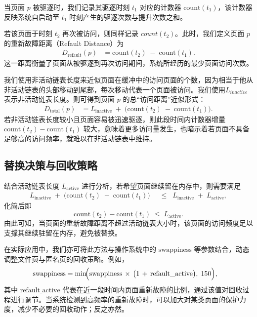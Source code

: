 当页面 \(p\) 被驱逐时，我们记录其驱逐时刻 \(t_1\) 对应的计数器 \(\mathrm{count}(t_1)\)，该计数器反映系统自启动至 \(t_1\) 时刻产生的驱逐次数与提升次数之和。

若该页面于时刻 \(t_2\) 再次被访问，则同样记录 \(count(t_2)\)。此时，我们定义页面 \(p\) 的重新故障距离（Refault Distance）为
\begin{align}
  \label{eq:refault_distance}
  D_{\mathrm{refault}}(p)
  &= 
  \mathrm{count}(t_2)
  \;-\;
  \mathrm{count}(t_1).
\end{align}
这一距离衡量了页面从被驱逐到再次访问期间，系统所经历的最少页面访问次数。



我们使用非活动链表长度来近似页面在缓冲中的访问页面的个数，因为相当于他从非活动链表的头部移动到尾部，每次移动代表一个页面被访问。我们使用\( L_{inactive}\) 表示非活动链表长度。则可得到页面 \(p\) 的总“访问距离”近似形式：
\begin{align}
  \label{eq:dtotal}
  D_{\mathrm{total}}(p)
  &= 
  L_{\mathrm{inactive}}
  \;+\;
  \bigl(\mathrm{count}(t_2) \;-\; \mathrm{count}(t_1)\bigr).
\end{align}
若非活动链表长度较小且页面容易被迅速驱逐，则此段时间内计数器增量 \(\mathrm{count}(t_2)-\mathrm{count}(t_1)\) 较大，意味着更多访问量发生，也暗示着若页面不具备足够高的访问频率，就难以在非活动链表中维持。


\subsection{替换决策与回收策略}

结合活动链表长度 \(\displaystyle L_{\mathrm{active}}\) 进行分析，若希望页面继续留在内存中，则需要满足
\begin{align}
  \label{eq:active_condition}
  L_{\mathrm{inactive}}
  \;+\;
  \bigl(\mathrm{count}(t_2) \;-\; \mathrm{count}(t_1)\bigr)
  &\;\;\le\;\;
  L_{\mathrm{inactive}}
  \;+\;
  L_{\mathrm{active}},
\end{align}
化简后即
\[
  \mathrm{count}(t_2) - \mathrm{count}(t_1)
  \;\le\;
  L_{\mathrm{active}}.
\]
由此可知，当页面的重新故障距离不超过活动链表大小时，该页面的访问频度足以支撑其继续驻留在内存，避免被替换。

在实际应用中，我们亦可将此方法与操作系统中的 \(\mathrm{swappiness}\) 等参数结合，动态调整文件页与匿名页的回收策略。例如，
\begin{align}
  \mathrm{swappiness}
  &=
  \min\!
  \Bigl(
    \mathrm{swappiness}
    \,\times\,
    \bigl(1 \,+\, \mathrm{refault\_active}\bigr),
    \;150
  \Bigr),
\end{align}
其中 \(\mathrm{refault\_active}\) 代表在近一段时间内页面重新故障的比例，通过该值对回收过程进行调节。当系统检测到高频率的重新故障时，可以加大对某类页面的保护力度，减少不必要的回收动作；反之亦然。

